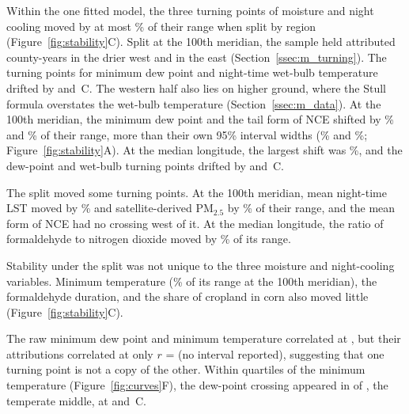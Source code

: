 \documentclass[sensors,article,submit,moreauthors,pdftex]{Definitions/mdpi}
\begin{document}
Within the one fitted model, the three turning points of moisture and night
cooling moved by at most \RegMerTripletMax{}\% of their range when split by region
(Figure~\ref{fig:stability}C). Split at the 100th meridian, the sample held
\RegMerWest{} attributed county-years in the drier west and \RegMerEast{} in
the east (Section~\ref{ssec:m_turning}). The turning points for minimum
dew point and night-time wet-bulb temperature
drifted by \RegMerDewAbs{} and
\RegMerWetAbs{}\,\textdegree C. The western half also lies on higher
ground, where the Stull formula overstates the wet-bulb temperature (Section~\ref{ssec:m_data}). At the 100th meridian, the minimum dew point
and the tail form of NCE shifted by \RegMerDew{}\% and \RegMerNce{}\% of their
range, more than their own 95\% interval widths (\TpDewWidth{}\% and
\TpNceWidth{}\%; Figure~\ref{fig:stability}A). At the median longitude, the
largest shift was \RegMedTripletMax{}\%, and the dew-point and wet-bulb turning points drifted by \RegMedDewAbs{}
and \RegMedWetAbs{}\,\textdegree C.

The split moved some turning points. At the 100th meridian, mean night-time LST
moved by \RegMerLst{}\% and satellite-derived PM$_{2.5}$ by \RegMerPm{}\% of
their
range, and the mean form of NCE had no crossing west of it. At the median
longitude, the ratio of formaldehyde to nitrogen dioxide moved by
\RegMedRatio{}\% of its range.

Stability under the split was not unique to the
three moisture and night-cooling variables. Minimum temperature
(\RegMerTmin{}\% of its range at the 100th meridian), the formaldehyde
duration, and the share of cropland in corn also moved little (Figure~\ref{fig:stability}C).

The raw
minimum dew point and minimum temperature correlated at \RawCorr{}, but their
attributions correlated at only $r$ = \ShapCorr{} (no interval reported), suggesting that one turning point
is not a copy of the other. Within quartiles of the
minimum temperature (Figure~\ref{fig:curves}F), the dew-point crossing
appeared in \StrataWithCrossing{} of \StrataTotal{}, the temperate middle, at
\StrataCrossLo{} and \StrataCrossHi{}\,\textdegree C.
%
\end{document}
